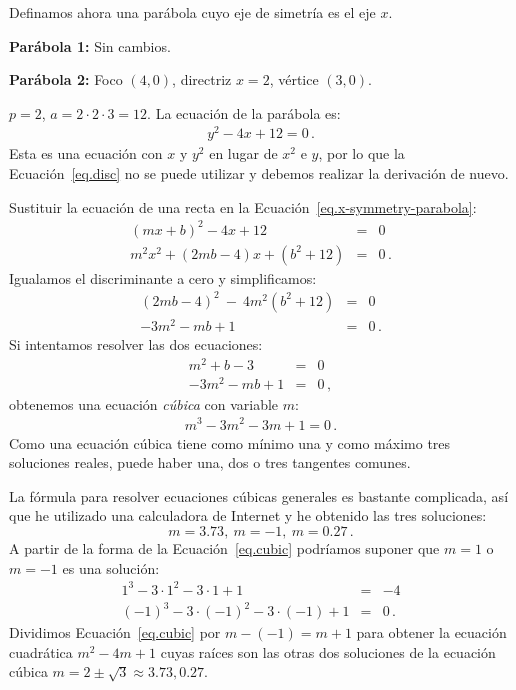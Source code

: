 \begin{example}\mbox{}

\noindent Definamos ahora una parábola cuyo eje de simetría es el eje $x$.

\noindent\textbf{Parábola 1:} Sin cambios. 

\noindent\textbf{Parábola 2:} Foco $(4,0)$, directriz $x=2$, vértice $(3,0)$.

\noindent{}$p=2$, $a=2\cdot 2\cdot 3=12$. La ecuación de la parábola es:
\begin{align}
y^2-4x+12 = 0\,.\label{eq.x-symmetry-parabola}
\end{align}
Esta es una ecuación con $x$ y $y^2$ en lugar de $x^2$ e $y$, por lo que la Ecuación~\ref{eq.disc} no se puede utilizar y debemos realizar la derivación de nuevo.

Sustituir la ecuación de una recta en la Ecuación~\ref{eq.x-symmetry-parabola}:
\begin{eqnarray*}
(mx+b)^2-4x+12&=&0\\
m^2x^2+(2mb-4)x+(b^2+12)&=&0\,.
\end{eqnarray*}
Igualamos el discriminante a cero y simplificamos:
\begin{eqnarray*}
(2mb-4)^2\:-\:4m^2(b^2+12)&=&0\\
-3m^2-mb+1&=&0\,.
\end{eqnarray*}
Si intentamos resolver las dos ecuaciones:
\begin{eqnarray*}
m^2+b-3&=&0\\
-3m^2-mb+1&=&0\,,
\end{eqnarray*}
obtenemos una ecuación \emph{cúbica} con variable $m$:
\begin{align}
m^3-3m^2-3m+1=0\,.\label{eq.cubic}
\end{align}
Como una ecuación cúbica tiene como mínimo una y como máximo tres soluciones reales, puede haber una, dos o tres tangentes comunes.

La fórmula para resolver ecuaciones cúbicas generales es bastante complicada, así que he utilizado una calculadora de Internet y he obtenido las tres soluciones:
\[m=3.73,\:m=-1,\:m=0.27\,.\]
A partir de la forma de la Ecuación~\ref {eq.cubic} podríamos suponer que $m=1$ o $m=-1$ es una solución:
\begin{eqnarray*}
1^3-3\cdot 1^2-3\cdot 1+1&=&-4\\
(-1)^3-3\cdot (-1)^2-3\cdot(-1)+1&=&0\,.
\end{eqnarray*}
Dividimos Ecuación~\ref{eq.cubic} por $m-(-1)=m+1$ para obtener la ecuación cuadrática $m^2-4m+1$ cuyas raíces son las otras dos soluciones de la ecuación cúbica $m=2\pm\sqrt{3}\approx 3.73, 0.27$.
\end{example}

